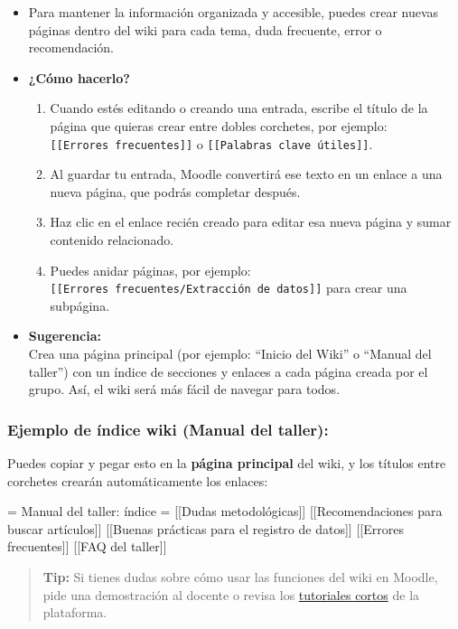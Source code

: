 \documentclass[
  letterpaper,
]{book}
\providecommand{\tightlist}{%
  \setlength{\itemsep}{0pt}\setlength{\parskip}{0pt}}\usepackage{longtable,booktabs,array}
\begin{document}
\begin{itemize}
\tightlist
\item
  Para mantener la información organizada y accesible, puedes crear
  nuevas páginas dentro del wiki para cada tema, duda frecuente, error o
  recomendación.
\item
  \textbf{¿Cómo hacerlo?}

  \begin{enumerate}
  \def\labelenumi{\arabic{enumi}.}
  \tightlist
  \item
    Cuando estés editando o creando una entrada, escribe el título de la
    página que quieras crear entre dobles corchetes, por ejemplo:
    \texttt{{[}{[}Errores\ frecuentes{]}{]}} o
    \texttt{{[}{[}Palabras\ clave\ útiles{]}{]}}.\\
  \item
    Al guardar tu entrada, Moodle convertirá ese texto en un enlace a
    una nueva página, que podrás completar después.
  \item
    Haz clic en el enlace recién creado para editar esa nueva página y
    sumar contenido relacionado.
  \item
    Puedes anidar páginas, por ejemplo:
    \texttt{{[}{[}Errores\ frecuentes/Extracción\ de\ datos{]}{]}} para
    crear una subpágina.
  \end{enumerate}
\item
  \textbf{Sugerencia:}\\
  Crea una página principal (por ejemplo: ``Inicio del Wiki'' o ``Manual
  del taller'') con un índice de secciones y enlaces a cada página
  creada por el grupo. Así, el wiki será más fácil de navegar para
  todos.
\end{itemize}

\subsubsection{Ejemplo de índice wiki (Manual del
taller):}\label{ejemplo-de-uxedndice-wiki-manual-del-taller}

Puedes copiar y pegar esto en la \textbf{página principal} del wiki, y
los títulos entre corchetes crearán automáticamente los enlaces:

= Manual del taller: índice = {[}{[}Dudas metodológicas{]}{]}
{[}{[}Recomendaciones para buscar artículos{]}{]} {[}{[}Buenas prácticas
para el registro de datos{]}{]} {[}{[}Errores frecuentes{]}{]} {[}{[}FAQ
del taller{]}{]}

\begin{quote}
\textbf{Tip:} Si tienes dudas sobre cómo usar las funciones del wiki en
Moodle, pide una demostración al docente o revisa los
\href{https://docs.moodle.org/all/es/Uso_de_Wiki}{tutoriales cortos} de
la plataforma.
\end{quote}
\end{document}
